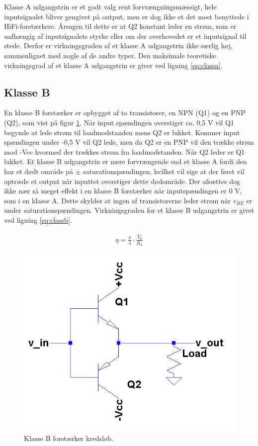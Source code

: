 Klasse A udgangstrin er et godt valg rent forvrængningsmæssigt, hele inputsignalet bliver gengivet på output, men er dog ikke et det mest benyttede i HiFi-forstærkere. Årsagen til dette er at Q2 konstant leder en strøm, som er uafhængig af inputsignalets styrke eller om der overhovedet er et inputsignal til stede. Derfor er virkningsgraden af et klasse A udgangstrin ikke særlig høj, sammenlignet med nogle af de andre typer. Den maksimale teoretiske virkningsgrad af et klasse A udgangstrin er giver ved ligning \ref{eq:classa}.

\subsection{Klasse B}
En klasse B forstærker er opbygget af to transistorer, en NPN (Q1) og en PNP (Q2), som vist på figur \ref{fig:classb}. Når input spændingen overstiger ca. 0,5 V vil Q1 begynde at lede strøm til loadmodstanden mens Q2 er lukket. Kommer input spændingen under -0,5 V vil Q2 lede, men da Q2 er en PNP vil den trække strøm mod -Vcc hvormed der trækkes strøm fra loadmodstanden. Når Q2 leder er Q1 lukket. 
Et klasse B udgangstrin er mere forvrængende end et klasse A fordi den har et dødt område på  $\pm$ saturationspændingen, hvilket vil sige at der først vil optræde et output når inputtet overstiger dette dødområde.  Der afsættes dog ikke nær så meget effekt i en klasse B forstærker når inputspændingen er 0 V, som i en klasse A. Dette skyldes at ingen af transistorerne leder strøm når $v_{BE} $ er under saturationspændingen. Virkningsgraden for et klasse B udgangstrin er givet ved ligning \ref{eq:classb}.

\begin{eqnarray}
\eta= \frac{\pi}{4} \cdot \frac{\hat{V}_o}{R_L}  \label{eq:classb}
\end{eqnarray}

\begin{figure}[h]
\centering
\includegraphics[scale=.35]{indledende_analyse/klasser/classb.png}
\caption{Klasse B forstærker kredsløb.}
\label{fig:classb}
\end{figure}

